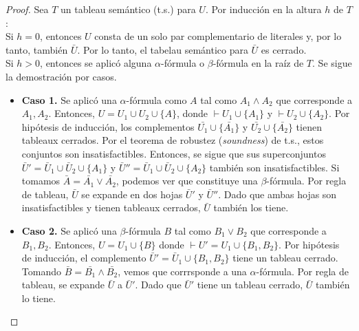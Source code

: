 \documentclass[letterpaper,12pt]{memoir}
\theoremstyle{definition}
\begin{document}
\begin{proof}

  Sea \(T\) un tableau semántico (t.s.) para \(U\). Por inducción en la altura \(h\) de \(T\):\\

  Si \(h = 0\), entonces \(U\) consta de un solo par complementario de literales y, por lo tanto, también \(\bar{U}\). Por lo tanto, el tabelau semántico para \(\bar{U}\) es cerrado. \\

  Si \(h > 0\), entonces se aplicó alguna \(\alpha\)-fórmula o \(\beta\)-fórmula en la raíz de \(T\). Se sigue la demostración por casos.\\ 

  \begin{itemize}
    \item \textbf{Caso 1.} Se aplicó una \(\alpha\)-fórmula como \(A\) tal como \(A_1 \land A_2\) que corresponde a \(A_1, A_2\). Entonces, \(U = U_1 \cup U_2 \cup \{A\}\), donde \(\vdash U_1 \cup \{A_1\}\) y \(\vdash U_2 \cup \{A_2\}\). Por hipótesis de inducción, los complementos \(\bar{U_1} \cup \{\bar{A_1}\}\) y \(\bar{U_2}  \cup \{\bar{A_2}\}\) tienen tableaux cerrados. Por el teorema de robustez (\textit{soundness}) de t.s., estos conjuntos son insatisfactibles. Entonces, se sigue que sus superconjuntos \(\bar{U}' = \bar{U}_1 \cup \bar{U}_2 \cup \{A_1\}\) y \(\bar{U}'' = \bar{U}_1 \cup \bar{U}_2 \cup \{A_2\}\) también son insatisfactibles. Si tomamos \(\bar{A} = \bar{A_1} \lor \bar{A_2}\), podemos ver que constituye una \(\beta\)-fórmula. Por regla de tableau, \(\bar{U}\) se expande en dos hojas \(\bar{U}'\) y \(\bar{U}''\). Dado que ambas hojas son insatisfactibles y tienen tableaux cerrados, \(\bar{U}\) también los tiene.\\
    \item \textbf{Caso 2.} Se aplicó una  \(\beta\)-fórmula \(B\) tal como \(B_1 \lor B_2\) que corresponde a \(B_1,B_2\). Entonces, \(U = U_1 \cup \{B\}\) donde \(\vdash U' = U_1 \cup \{B_1, B_2\} \). Por hipótesis de inducción, el complemento \(\bar{U}' = \bar{U}_1 \cup \{B_1, B_2\}\) tiene un tableau cerrado. Tomando \(\bar{B} = \bar{B_1} \land \bar{B_2}\), vemos que corrrsponde a una \(\alpha\)-fórmula. Por regla de tableau, se expande \(\bar{U}\) a \(\bar{U}'\). Dado que \(\bar{U}'\) tiene un tableau cerrado, \(\bar{U}\) también lo tiene.
  \end{itemize}
  
\end{proof}
\end{document}
